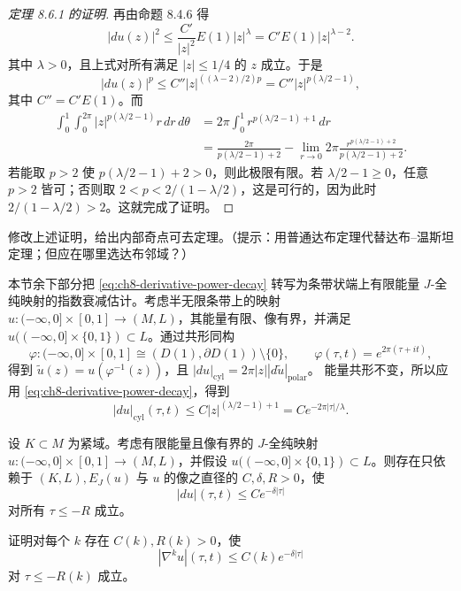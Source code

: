 \begin{proof}[定理 8.6.1 的证明]
再由命题 8.4.6 得
\begin{equation}
 |du(z)|^2\leq\frac{C'}{|z|^2}E(1)|z|^\lambda
 =C'E(1)|z|^{\lambda-2}.
 \label{eq:ch8-derivative-power-decay}
\end{equation}
其中 $\lambda>0$，且上式对所有满足 $|z|\leq1/4$ 的 $z$ 成立。于是
\[
 |du(z)|^p\leq C''|z|^{((\lambda-2)/2)p}
 =C''|z|^{p(\lambda/2-1)},
\]
其中 $C''=C'E(1)$。而
\[
 \begin{split}
 \int_0^1\int_0^{2\pi}|z|^{p(\lambda/2-1)}r\,dr\,d\theta
 &=2\pi\int_0^1r^{p(\lambda/2-1)+1}\,dr\\
 &=\frac{2\pi}{p(\lambda/2-1)+2}
 -\lim_{r\to0}2\pi\frac{r^{p(\lambda/2-1)+2}}{p(\lambda/2-1)+2}.
 \end{split}
\]
若能取 $p>2$ 使 $p(\lambda/2-1)+2>0$，则此极限有限。若
$\lambda/2-1\geq0$，任意 $p>2$ 皆可；否则取
$2<p<2/(1-\lambda/2)$，这是可行的，因为此时 $2/(1-\lambda/2)>2$。这就完成了证明。
\end{proof}

\begin{exercise}\label{ex:ch8-interior-removal}
修改上述证明，给出内部奇点可去定理。（提示：用普通达布定理代替达布--温斯坦定理；但应在哪里选达布邻域？）
\end{exercise}

本节余下部分把 \eqref{eq:ch8-derivative-power-decay} 转写为条带状端上有限能量
$J$-全纯映射的指数衰减估计。考虑半无限条带上的映射
$u:(-\infty,0]\times[0,1]\to(M,L)$，其能量有限、像有界，并满足
$u(( -\infty,0]\times\{0,1\})\subset L$。通过共形同构
\[
 \varphi:(-\infty,0]\times[0,1]\cong
 (D(1),\partial D(1))\setminus\{0\},\qquad
 \varphi(\tau,t)=e^{2\pi(\tau+it)},
\]
得到
$\widetilde u(z)=u(\varphi^{-1}(z))$，且
$|du|_{\mathrm{cyl}}=2\pi|z||d\widetilde u|_{\mathrm{polar}}$。
能量共形不变，所以应用 \eqref{eq:ch8-derivative-power-decay}，得到
\[
 |du|_{\mathrm{cyl}}(\tau,t)
 \leq C|z|^{(\lambda/2-1)+1}=Ce^{-2\pi|\tau|/\lambda}.
\]
\begin{theorem}[指数衰减]\label{thm:ch8-exponential-decay}
设 $K\subset M$ 为紧域。考虑有限能量且像有界的 $J$-全纯映射
$u:(-\infty,0]\times[0,1]\to(M,L)$，并假设
$u((-\infty,0]\times\{0,1\})\subset L$。则存在只依赖于
$(K,L),E_J(u)$ 与 $u$ 的像之直径的
$C,\delta,R>0$，使
\begin{equation}|du|(\tau,t)\leq Ce^{-\delta|\tau|}\label{eq:ch8-exponential-decay}
\end{equation}
对所有 $\tau\leq-R$ 成立。
\end{theorem}
\begin{exercise}\label{ex:ch8-ck-exponential-decay}
证明对每个 $k$ 存在 $C(k),R(k)>0$，使
\begin{equation}|\nabla^ku|(\tau,t)\leq C(k)e^{-\delta|\tau|}\label{eq:ch8-ck-exponential-decay}
\end{equation}
对 $\tau\leq-R(k)$ 成立。
\end{exercise}
